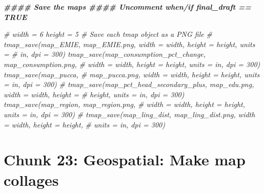 \documentclass[
]{article}
\newenvironment{Shaded}{\begin{snugshade}}{\end{snugshade}}
\newcommand{\CommentTok}[1]{\textcolor[rgb]{0.56,0.35,0.01}{\textit{#1}}}
\newcommand{\DocumentationTok}[1]{\textcolor[rgb]{0.56,0.35,0.01}{\textbf{\textit{#1}}}}
\begin{document}
\begin{Shaded}
\begin{Highlighting}[]
\DocumentationTok{\#\#\#\# Save the maps \#\#\#\# Uncomment when/if final\_draft == TRUE}

\CommentTok{\# width = 6 height = 5 \# Save each tmap object as a PNG file}
\CommentTok{\# tmap\_save(map\_EMIE, \textquotesingle{}map\_EMIE.png\textquotesingle{}, width = width, height = height, units =}
\CommentTok{\# \textquotesingle{}in\textquotesingle{}, dpi = 300) tmap\_save(map\_consumption\_pct\_change, \textquotesingle{}map\_consumption.png\textquotesingle{},}
\CommentTok{\# width = width, height = height, units = \textquotesingle{}in\textquotesingle{}, dpi = 300) tmap\_save(map\_pucca,}
\CommentTok{\# \textquotesingle{}map\_pucca.png\textquotesingle{}, width = width, height = height, units = \textquotesingle{}in\textquotesingle{}, dpi = 300)}
\CommentTok{\# tmap\_save(map\_pct\_head\_secondary\_plus, \textquotesingle{}map\_edu.png\textquotesingle{}, width = width, height =}
\CommentTok{\# height, units = \textquotesingle{}in\textquotesingle{}, dpi = 300) tmap\_save(map\_region, \textquotesingle{}map\_region.png\textquotesingle{},}
\CommentTok{\# width = width, height = height, units = \textquotesingle{}in\textquotesingle{}, dpi = 300)}
\CommentTok{\# tmap\_save(map\_ling\_dist, \textquotesingle{}map\_ling\_dist.png\textquotesingle{}, width = width, height = height,}
\CommentTok{\# units = \textquotesingle{}in\textquotesingle{}, dpi = 300)}
\end{Highlighting}
\end{Shaded}

\section*{Chunk 23: Geospatial: Make map collages}\label{chunk-23-geospatial-make-map-collages}
\end{document}
